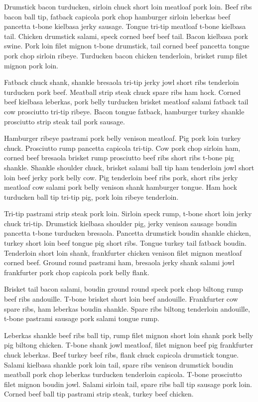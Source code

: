 Drumstick bacon turducken, sirloin chuck short loin meatloaf pork loin. Beef ribs bacon ball tip, fatback capicola pork chop hamburger sirloin leberkas beef pancetta t-bone kielbasa jerky sausage. Tongue tri-tip meatloaf t-bone kielbasa tail. Chicken drumstick salami, speck corned beef beef tail. Bacon kielbasa pork swine. Pork loin filet mignon t-bone drumstick, tail corned beef pancetta tongue pork chop sirloin ribeye. Turducken bacon chicken tenderloin, brisket rump filet mignon pork loin.

Fatback chuck shank, shankle bresaola tri-tip jerky jowl short ribs tenderloin turducken pork beef. Meatball strip steak chuck spare ribs ham hock. Corned beef kielbasa leberkas, pork belly turducken brisket meatloaf salami fatback tail cow prosciutto tri-tip ribeye. Bacon tongue fatback, hamburger turkey shankle prosciutto strip steak tail pork sausage.

Hamburger ribeye pastrami pork belly venison meatloaf. Pig pork loin turkey chuck. Prosciutto rump pancetta capicola tri-tip. Cow pork chop sirloin ham, corned beef bresaola brisket rump prosciutto beef ribs short ribs t-bone pig shankle. Shankle shoulder chuck, brisket salami ball tip ham tenderloin jowl short loin beef jerky pork belly cow. Pig tenderloin beef ribs pork, short ribs jerky meatloaf cow salami pork belly venison shank hamburger tongue. Ham hock turducken ball tip tri-tip pig, pork loin ribeye tenderloin.

Tri-tip pastrami strip steak pork loin. Sirloin speck rump, t-bone short loin jerky chuck tri-tip. Drumstick kielbasa shoulder pig, jerky venison sausage boudin pancetta t-bone turducken bresaola. Pancetta drumstick boudin shankle chicken, turkey short loin beef tongue pig short ribs. Tongue turkey tail fatback boudin. Tenderloin short loin shank, frankfurter chicken venison filet mignon meatloaf corned beef. Ground round pastrami ham, bresaola jerky shank salami jowl frankfurter pork chop capicola pork belly flank.

Brisket tail bacon salami, boudin ground round speck pork chop biltong rump beef ribs andouille. T-bone brisket short loin beef andouille. Frankfurter cow spare ribs, ham leberkas boudin shankle. Spare ribs biltong tenderloin andouille, t-bone pastrami sausage pork salami tongue rump.

Leberkas shankle beef ribs ball tip, rump filet mignon short loin shank pork belly pig biltong chicken. T-bone shank jowl meatloaf, filet mignon beef pig frankfurter chuck leberkas. Beef turkey beef ribs, flank chuck capicola drumstick tongue. Salami kielbasa shankle pork loin tail, spare ribs venison drumstick boudin meatball pork chop leberkas turducken tenderloin capicola. T-bone prosciutto filet mignon boudin jowl. Salami sirloin tail, spare ribs ball tip sausage pork loin. Corned beef ball tip pastrami strip steak, turkey beef chicken.

